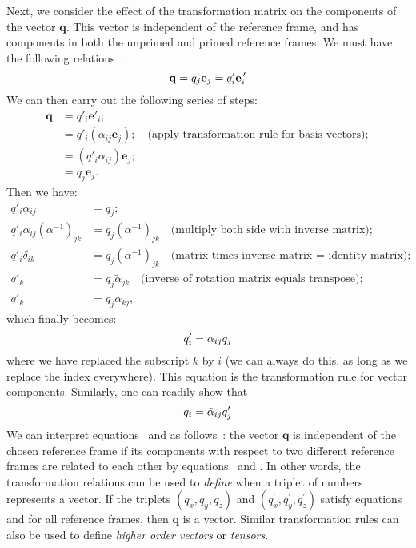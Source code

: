 Next, we consider the effect of the transformation matrix on the components of the vector $\mathbf{q}$.  This vector is independent of the reference frame, and has components in both the unprimed and primed reference frames.  We must have the following relations~:
\begin{equation}
\mathbf{q}=q_j\mathbf{e}_j=q_i^{\prime}\mathbf{e}_i^{\,\prime}
\OClabel{eq:stuff1}
\end{equation}
We can then carry out the following series of steps:
\begin{align*}
	\mathbf{q} &= q'_i\mathbf{e}'_i;\\
	&= q'_i (\alpha_{ij}\mathbf{e}_j);\quad\text{(apply transformation rule for basis vectors)};\\
	&= (q'_i \alpha_{ij})\mathbf{e}_j;\\
	&= q_j\mathbf{e}_j.
\end{align*}
Then we have:
\begin{align*}
	q'_i\alpha_{ij} &= q_j;\\
	q'_i\alpha_{ij}(\alpha^{-1})_{jk} &= q_j(\alpha^{-1})_{jk}\quad\text{(multiply both side with inverse matrix)};\\
	q'_i\delta_{ik} &= q_j(\alpha^{-1})_{jk}\quad\text{(matrix times inverse matrix = identity matrix)};\\
	q'_k &= q_j\tilde{\alpha}_{jk}\quad\text{(inverse of rotation matrix equals transpose)};\\
	q'_k &= q_j\alpha_{kj},	
\end{align*}
which finally becomes:
\begin{equation}
	q'_i = \alpha_{ij}q_j\OClabel{eq:stuff4}
\end{equation}
where we have replaced the subscript $k$ by $i$ (we can always do this, as long as we replace the index everywhere).
This equation is the transformation rule for vector components.
Similarly, one can readily show that
\begin{equation}
q_i=\tilde{\alpha}_{ij}q_j^{\prime}
\OClabel{eq:stuff5}
\end{equation}
We can interpret equations~ and  as 
follows~: the vector $\mathbf{q}$ is independent of the chosen reference 
frame if its components with respect to two different reference frames 
are related to each other by equations~ and 
.  In other words, the transformation relations can be 
used to \textit{define} when a triplet of numbers represents a vector.  
If the triplets $(q_x,q_y,q_z)$ and 
$(q_x^{\prime},q_y^{\prime},q_z^{\prime})$ satisfy 
equations~ and  for all reference 
frames, then $\mathbf{q}$ is a vector.  Similar transformation rules 
can also be used to define \textit{higher order vectors} or \textit{tensors}.



